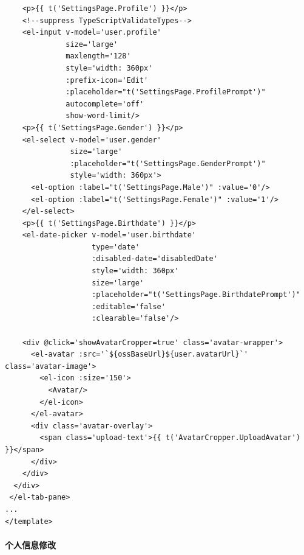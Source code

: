 \begin{itemize}
\begin{verbatim}
    <p>{{ t('SettingsPage.Profile') }}</p>
    <!--suppress TypeScriptValidateTypes-->
    <el-input v-model='user.profile'
              size='large'
              maxlength='128'
              style='width: 360px'
              :prefix-icon='Edit'
              :placeholder="t('SettingsPage.ProfilePrompt')"
              autocomplete='off'
              show-word-limit/>
    <p>{{ t('SettingsPage.Gender') }}</p>
    <el-select v-model='user.gender'
               size='large'
               :placeholder="t('SettingsPage.GenderPrompt')"
               style='width: 360px'>
      <el-option :label="t('SettingsPage.Male')" :value='0'/>
      <el-option :label="t('SettingsPage.Female')" :value='1'/>
    </el-select>
    <p>{{ t('SettingsPage.Birthdate') }}</p>
    <el-date-picker v-model='user.birthdate'
                    type='date'
                    :disabled-date='disabledDate'
                    style='width: 360px'
                    size='large'
                    :placeholder="t('SettingsPage.BirthdatePrompt')"
                    :editable='false'
                    :clearable='false'/>
	
    <div @click='showAvatarCropper=true' class='avatar-wrapper'>
      <el-avatar :src='`${ossBaseUrl}${user.avatarUrl}`' class='avatar-image'>
        <el-icon :size='150'>
          <Avatar/>
        </el-icon>
      </el-avatar>
      <div class='avatar-overlay'>
        <span class='upload-text'>{{ t('AvatarCropper.UploadAvatar') }}</span>
      </div>
    </div>
  </div>
 </el-tab-pane>
...
</template>
	\end{verbatim}

\end{itemize}

\paragraph{个人信息修改}

